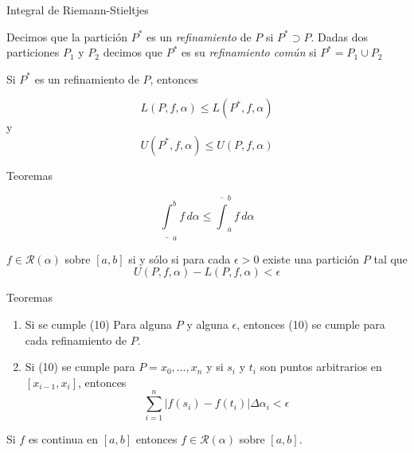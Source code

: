 \documentclass[10pt]{beamer}
\begin{document}
\begin{frame}{Integral de Riemann-Stieltjes}

\begin{definition}[5]
Decimos que la partición $P^*$ es un \textit{refinamiento} de $P$ si $P^* \supset P$. Dadas dos particiones $P_1$ y $P_2$ decimos que $P^*$ es su \textit{refinamiento común} si $P^* = P_1 \cup P_2$
\end{definition}

\begin{theorem}[1]
Si $P^*$ es un refinamiento de $P$, entonces

\begin{equation}
	L(P, f, \alpha) \leq L(P^*, f, \alpha)
\end{equation}
y
\begin{equation}
	U(P^*, f, \alpha) \leq U(P, f, \alpha)
\end{equation}
\end{theorem}

\end{frame}

\begin{frame}{Teoremas}

\begin{theorem}[2]
\[
	\underline{\int}_a^b f\,d\alpha \leq \overline{\int}_a^b f\,d\alpha
\]
\end{theorem}

\begin{theorem}[3]
$f \in \mathcal{R}(\alpha)$ sobre $[a, b]$ si y sólo si para cada $\epsilon > 0$ existe una partición $P$ tal que
\begin{equation}
	U(P, f, \alpha) - L(P, f, \alpha) < \epsilon
\end{equation}
\end{theorem}

\end{frame}

\begin{frame}{Teoremas}

\begin{theorem}[4]
	\begin{enumerate}
		\item Si se cumple (10) Para alguna $P$ y alguna $\epsilon$, entonces (10) se cumple para cada refinamiento de $P$.
		\item Si (10) se cumple para $P = {x_0, \dots, x_n}$ y si $s_i$ y $t_i$ son puntos arbitrarios en $[x_{i-1}, x_i]$, entonces
		\[
			\sum_{i=1}^n |f(s_i) - f(t_i)|\Delta\alpha_i < \epsilon
		\]
	\end{enumerate}
\end{theorem}

\begin{theorem}[5]
Si $f$ es continua en $[a, b]$ entonces $f \in \mathcal{R}(\alpha)$ sobre $[a, b]$.
\end{theorem}

\end{frame}
\end{document}
